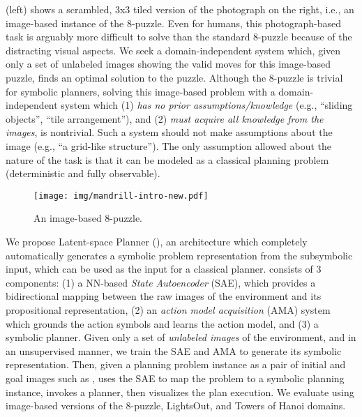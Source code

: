 \documentclass[11pt]{article}
\begin{document}
 (left) shows a scrambled, 3x3 tiled version of the photograph on the right, i.e., an image-based instance of the 8-puzzle.
Even for humans, this photograph-based task is arguably more difficult to solve than the standard 8-puzzle because of the distracting visual aspects.
We seek a domain-independent system which, given only a set of unlabeled images showing the valid moves for this image-based puzzle, finds an optimal solution to the puzzle.
Although the 8-puzzle is trivial for symbolic planners, solving this image-based problem with 
a domain-independent system which (1)  \emph{has no prior assumptions/knowledge}
 (e.g., ``sliding objects'', ``tile arrangement''), and (2) \emph{must acquire all knowledge from the images}, is nontrivial.
Such a system should not make assumptions about the image (e.g., ``a grid-like structure'').
The only assumption allowed about the nature of the task is that it can be modeled as a classical planning problem (deterministic and fully observable).


\begin{figure}[tbp]
 \centering
 \texttt{[image: img/mandrill-intro-new.pdf]}
 \caption{An image-based 8-puzzle.}
 \label{fig:mandrill-intro}
\end{figure}


We propose Latent-space Planner (\latentplanner), an architecture which completely automatically generates a 
symbolic problem representation from the subsymbolic input, which can be used as the input for a classical planner.
\latentplanner consists of 3 components: (1) a NN-based {\it State Autoencoder} (SAE), which provides a bidirectional mapping between the raw images of the environment and its propositional representation, 
(2) an {\it action model acquisition} (AMA) system which grounds the action symbols and learns the action model,
and (3) a symbolic planner. 
Given only a set of {\it unlabeled images} of the environment, and in an unsupervised manner,
we train the SAE and AMA to generate its symbolic representation.
Then, given a planning problem instance as a pair of initial and goal images such as , \latentplanner 
uses the SAE to map the problem to a symbolic planning instance, invokes a planner, then visualizes the plan execution.
We evaluate \latentplanner using image-based versions of the 8-puzzle, LightsOut, and Towers of Hanoi domains.
\end{document}
